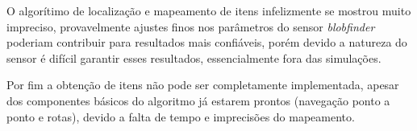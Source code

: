 \documentclass[11pt,oneside]{article}
\begin{document}
O algorítimo de localização e mapeamento de itens infelizmente se mostrou muito impreciso, provavelmente ajustes finos nos parâmetros do sensor \emph{blobfinder} poderiam contribuir para resultados mais confiáveis, porém devido a natureza do sensor é difícil garantir esses resultados, essencialmente fora das simulações.

Por fim a obtenção de itens não pode ser completamente implementada, apesar dos componentes básicos do algoritmo já estarem prontos (navegação ponto a ponto e rotas), devido a falta de tempo e imprecisões do mapeamento.
\end{document}
